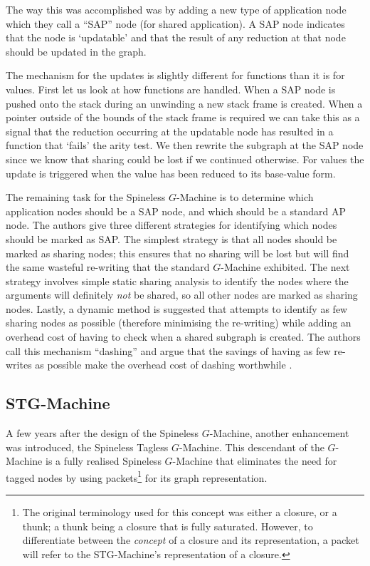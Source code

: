     The way this was accomplished was by adding a new type of application node
which they call a ``SAP'' node (for shared application). A SAP node indicates
that the node is `updatable' and that the result of any reduction at that node
should be updated in the graph.

    The mechanism for the updates is slightly different for functions than it is
for values. First let us look at how functions are handled. When a SAP node is
pushed onto the stack during an unwinding a new stack frame is created. When a
pointer outside of the bounds of the stack frame is required we can take this as
a signal that the reduction occurring at the updatable node has resulted in a
function that `fails' the arity test. We then rewrite the subgraph at the SAP
node since we know that sharing could be lost if we continued otherwise.
For values the update is triggered when the value has been reduced to its
base-value form.

    The remaining task for the Spineless $G$-Machine is to determine which
application nodes should be a SAP node, and which should be a standard AP node.
The authors give three different strategies for identifying which nodes should
be marked as SAP. The simplest strategy is that all nodes should be marked as
sharing nodes; this ensures that no sharing will be lost but will find the same
wasteful re-writing that the standard $G$-Machine exhibited. The next strategy
involves simple static sharing analysis to identify the nodes where the
arguments will definitely \emph{not} be shared, so all other nodes are marked as
sharing nodes. Lastly, a dynamic method is suggested that attempts to identify
as few sharing nodes as possible (therefore minimising the re-writing) while
adding an overhead cost of having to check when a shared subgraph is created.
The authors call this mechanism ``dashing'' and argue that the savings of having
as few re-writes as possible make the overhead cost of dashing worthwhile
\citep{burn1988spineless}.


 \subsection{STG-Machine}
    A few years after the design of the Spineless $G$-Machine, another
enhancement was introduced, the Spineless Tagless $G$-Machine. This descendant of
the $G$-Machine is a fully realised Spineless $G$-Machine that eliminates the
need for tagged nodes by using packets\footnote{The original terminology used
for this concept was either a closure, or a thunk; a thunk being a closure that
is fully saturated. However, to differentiate between the \emph{concept} of a
closure and its representation, a packet will refer to the STG-Machine's
representation of a closure.} for its graph representation.

